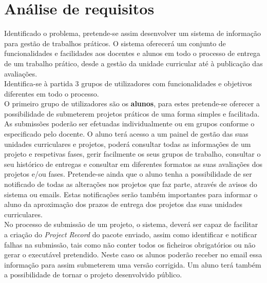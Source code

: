 \section{Análise de requisitos}


Identificado o problema, pretende-se assim desenvolver um sistema de informação para gestão de trabalhos práticos. O sistema oferecerá um conjunto de funcionalidades e facilidades aos docentes e alunos em todo o processo de entrega de um trabalho prático, desde a gestão da unidade curricular até à publicação das avaliações.\\

Identifica-se à partida 3 grupos de utilizadores com funcionalidades e objetivos diferentes em todo o processo.\\

O primeiro grupo de utilizadores são os \textbf{alunos}, para estes pretende-se oferecer a possibilidade de submeterem projetos práticos de uma forma simples e facilitada. As submissões poderão ser efetuadas individualmente ou em grupos conforme o especificado pelo docente. O aluno terá acesso a um painel de gestão das suas unidades curriculares e projetos, poderá consultar todas as informações de um projeto e respetivas fases, gerir facilmente os seus grupos de trabalho, consultar o seu histórico de entregas e consultar em diferentes formatos as suas avaliações dos projetos e/ou fases. Pretende-se ainda que o aluno tenha a possibilidade de ser notificado de todas as alterações nos projetos que faz parte, através de avisos do sistema ou emails. Estas notificações serão também importantes para informar o aluno da aproximação dos prazos de entrega dos projetos das suas unidades curriculares.\\
No processo de submissão de um projeto, o sistema, deverá ser capaz de facilitar a criação do \textit{Project Record} do pacote enviado, assim como identificar e notificar falhas na submissão, tais como não conter todos os ficheiros obrigatórios ou não gerar o executável pretendido. Neste caso os alunos poderão receber no email essa informação para assim submeterem uma versão corrigida.
Um aluno terá também a possibilidade de tornar o projeto desenvolvido público.\\

